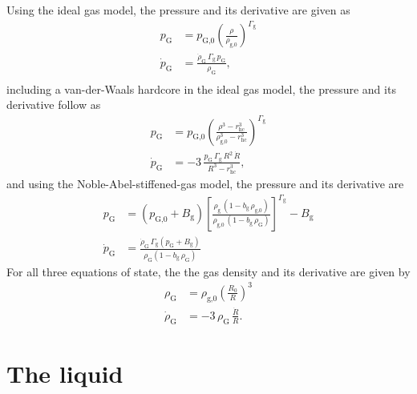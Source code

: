 Using the ideal gas model, the pressure and its derivative are given as
\begin{align}
  p_\text{G} &= p_\text{G,0} \left(\frac{\rho}{\rho_\text{g,0}}\right)^{\Gamma_\text{g}}\\
  \dot{p}_\text{G} &= \frac{\dot{\rho}_\text{G} \, \Gamma_\text{g} \, p_\text{G}}{\rho_\text{G}},\\
\end{align}
including a van-der-Waals hardcore in the ideal gas model, the pressure and its derivative follow as
\begin{align}
  p_\text{G} &= p_\text{G,0} \left(\frac{\rho^3-r_\text{hc}^3}{\rho_\text{g,0}^3-r_\text{hc}^3}\right)^{\Gamma_\text{g}}\\
  \dot{p}_\text{G} &= -3 \, \frac{p_\text{G} \, \Gamma_\text{g} \, R^2 \, \dot{R}}{R^3-r_\text{hc}^3},
\end{align}
and using the Noble-Abel-stiffened-gas model, the pressure and its derivative are \citep{Denner2021}
\begin{align}
  p_\text{G} &= (p_\text{G,0} + B_\text{g}) \left[\frac{\rho_\text{g} \, (1-b_\text{g} \, \rho_\text{g,0})}{\rho_\text{g,0} \, (1- b_\text{g} \, \rho_\text{G})} \right]^{\Gamma_\text{g}} - B_\text{g}\\
  \dot{p}_\text{G} &= \frac{\dot{\rho}_\text{G} \, \Gamma_\text{g} \left(p_\text{G} + B_\text{g} \right)}{\rho_\text{G} \left(1- b_\text{g} \, \rho_\text{G} \right)}
\end{align}
For all three equations of state, the the gas density and its derivative are given by 
\begin{align}
  \rho_\text{G} &= \rho_\text{g,0} \left(\frac{R_0}{R}\right)^3 \label{eq:rhoG}\\
  \dot{\rho}_\text{G} &= -3 \, \rho_\text{G}\, \frac{\dot{R}}{R}. \label{eq:dot_rhoG}
\end{align}


\section{The liquid}
\label{sec:liquid}

\vspace{0.8em}

